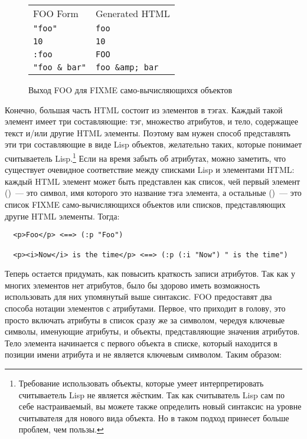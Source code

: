 \begin{figure}[tb]
\begin{tabular}{|>{\centering}m{25mm}|>{\centering}m{25mm}|}
  FOO Form &	Generated HTML \\
  \lstinline!"foo"! &\lstinline!foo! \\
  \lstinline!10! & \lstinline!10! \\
  \lstinline!:foo! & \lstinline!FOO! \\
  \lstinline!"foo & bar"! & \lstinline!foo &amp; bar!
\end{tabular}
  \caption{Выход FOO для FIXME само-вычисляющихся объектов} 
  \label{table:30-1}
\end{figure}

Конечно, большая часть HTML состоит из элементов в тэгах. Каждый такой элемент имеет три
составляющие: тэг, множество атрибутов, и тело, содержащее текст и/или другие HTML
элементы. Поэтому вам нужен способ представлять эти три составляющие в виде Lisp объектов,
желательно таких, которые понимает считываетель Lisp.\footnote{Требование использовать
  объекты, которые умеет интерпретировать считываетель Lisp не является жёстким. Так как
  считыватель Lisp сам по себе настраиваемый, вы можете также определить новый синтаксис
  на уровне считывателя для нового вида объекта. Но в таком подход принесет больше
  проблем, чем пользы.} Если на время забыть об атрибутах, можно заметить, что существует
очевидное соответствие между списками Lisp и элементами HTML: каждый HTML элемент может
быть представлен как список, чей первый элемент ()~--- это символ, имя которого
это название тэга элемента, а остальные ()~--- это список FIXME
само-вычисляющихся объектов или списков, представляющих другие HTML элементы. Тогда:

\begin{verbatim}
  <p>Foo</p> <==> (:p "Foo")

  <p><i>Now</i> is the time</p> <==> (:p (:i "Now") " is the time")
\end{verbatim}

Теперь остается придумать, как повысить краткость записи атрибутов. Так как у многих
элементов нет атрибутов, было бы здорово иметь возможность использовать для них упомянутый
выше синтаксис. FOO предоставят два способа нотации элементов с атрибутами. Первое, что
приходит в голову, это просто включать атрибуты в список сразу же за символом, чередуя
ключевые символы, именующие атрибуты, и объекты, представляющие значения атрибутов. Тело
элемента начинается с первого объекта в списке, который находится в позиции имени атрибута
и не является ключевым символом. Таким образом:

